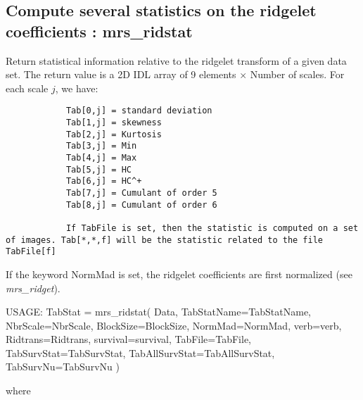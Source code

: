 \subsection{Compute several statistics on the ridgelet coefficients : mrs\_ridstat}
Return statistical information relative to the ridgelet transform of a given data set. The return value is a 2D IDL array 
of 9 elements $\times$ Number of scales. For each scale $j$, we have:
\begin{verbatim}
			Tab[0,j] = standard deviation
			Tab[1,j] = skewness
			Tab[2,j] = Kurtosis
			Tab[3,j] = Min
			Tab[4,j] = Max 
			Tab[5,j] = HC
			Tab[6,j] = HC^+
			Tab[7,j] = Cumulant of order 5
			Tab[8,j] = Cumulant of order 6
			
			If TabFile is set, then the statistic is computed on a set of images. Tab[*,*,f] will be the statistic related to the file TabFile[f]

\end{verbatim}
If the keyword NormMad is set, the ridgelet coefficients are first normalized (see {\em mrs\_ridget}).
{\bf
\begin{center}
     USAGE: TabStat = mrs\_ridstat( Data, TabStatName=TabStatName, NbrScale=NbrScale, BlockSize=BlockSize, NormMad=NormMad, verb=verb, 
     Ridtrans=Ridtrans, survival=survival, TabFile=TabFile, TabSurvStat=TabSurvStat, TabAllSurvStat=TabAllSurvStat, TabSurvNu=TabSurvNu )  
\end{center}}
where 
